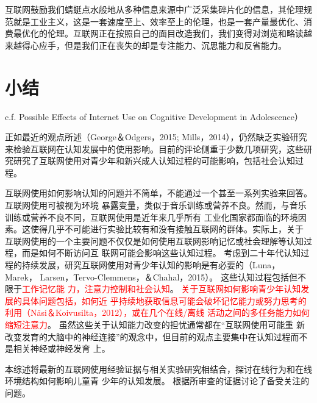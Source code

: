 互联网鼓励我们蜻蜓点水般地从多种信息来源中广泛采集碎片化的信息，其伦理规范就是工业主义，这是一套速度至上、效率至上的伦理，也是一套产量最优化、消费最优化的伦理。互联网正在按照自己的面目改造我们，我们变得对浏览和略读越来越得心应手，但是我们正在丧失的却是专注能力、沉思能力和反省能力。


\section{小结}

c.f. Possible Effects of Internet Use on Cognitive Development in Adolescence\cite{Mills2016}）

正如最近的观点所述（George＆Odgers，2015; Mills，2014），仍然缺乏实验研究来检验互联网在认知发展中的使用影响。目前的评论侧重于少数几项研究，这些研究研究了互联网使用对青少年和新兴成人认知过程的可能影响，包括社会认知过程。

互联网使用如何影响认知的问题并不简单，不能通过一个甚至一系列实验来回答。互联网使用可被视为环境
暴露变量，类似于音乐训练或营养不良。然而，与音乐训练或营养不良不同，互联网使用是近年来几乎所有
工业化国家都面临的环境因素。这使得几乎不可能进行实验比较有和没有接触互联网的群体。实际上，关于
互联网使用的一个主要问题不仅仅是如何使用互联网影响记忆或社会理解等认知过程，而是如何不断访问互
联网可能会影响这些认知过程。
考虑到二十年代认知过程的持续发展，研究互联网使用对青少年认知的影响是有必要的（Luna，Marek，
Larsen，Tervo-Clemmens，＆Chahal，2015）。 这些认知过程包括但不限于\textcolor{red}{工作记忆能
力，注意力控制和社会认知}。 \textcolor{red}{关于互联网如何影响青少年认知发展的具体问题包括，如何近
乎持续地获取信息可能会破坏记忆能力或努力思考的利用（Näsi＆Koivusilta，2012），或在几个在线/离线
活动之间的多任务能力如何缩短注意力}。 虽然这些关于认知能力改变的担忧通常都在“互联网使用可能重
新改变发育的大脑中的神经连接”的观念中，但目前的观点主要集中在认知过程而不是相关神经或神经发育
上。

 本综述将最新的互联网使用经验证据与相关实验研究相结合，探讨在线行为和在线环境结构如何影响儿童青
 少年的认知发展。 根据所审查的证据讨论了备受关注的问题。


